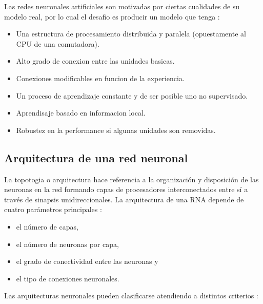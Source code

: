Las redes neuronales artificiales son motivadas por ciertas cualidades de su
modelo real, por lo cual el desafio es producir un modelo que tenga
\cite{nacelle2009redes}:
\begin{itemize}
  \item  Una estructura de procesamiento distribuida y paralela (opuestamente al CPU de una comutadora).


  \item Alto grado de conexion entre las unidades basicas.
  \item Conexiones modificables en funcion de la experiencia.
  \item Un proceso de aprendizaje constante y de ser posible uno no supervisado.
  \item Aprendisaje basado en informacion local.
  \item Robustez en la performance si algunas unidades son removidas.

\end{itemize}

\subsection{Arquitectura de una red neuronal}
La topotogia o arquitectura hace referencia a la organización y disposición de
las neuronas en la red formando capas de procesadores interconectados entre sí
a través de sinapsis unidireccionales. La arquitectura de una RNA depende de
cuatro parámetros principales \cite{lopez2008redes}:

\begin{itemize}
  \item el número de capas,
  \item el número de neuronas por capa,
  \item el grado de conectividad entre las neuronas y
  \item el tipo de conexiones neuronales.
\end{itemize}

\vspace{1\baselineskip}
Las arquitecturas neuronales pueden clasificarse atendiendo a distintos criterios \cite{lopez2008redes}:

